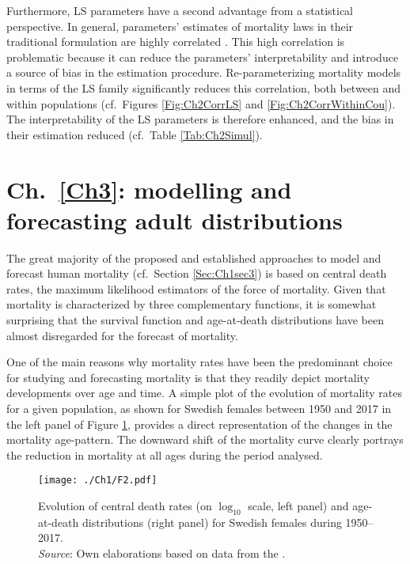 \documentclass[Thesis]{subfiles}
\begin{document}
Furthermore, LS parameters have a second advantage from a statistical perspective. In general, parameters' estimates of mortality laws in their traditional formulation are highly correlated \cite[cf.~Figure \ref{Fig:Ch2CorrNOR} in Chapter \ref{Ch2}, and see, for example,][]{missov2015gompertz}. This high correlation is problematic because it can reduce the parameters' interpretability and introduce a source of bias in the estimation procedure. Re-parameterizing mortality models in terms of the LS family significantly reduces this correlation, both between and within populations (cf.~Figures \ref{Fig:Ch2CorrLS} and \ref{Fig:Ch2CorrWithinCou}). The interpretability of the LS parameters is therefore enhanced, and the bias in their estimation reduced (cf.~Table \ref{Tab:Ch2Simul}).

\section{Ch.~\ref{Ch3}: modelling and forecasting adult distributions}\label{Sec:Ch1sec6}  
The great majority of the proposed and established approaches to model and forecast human mortality (cf.~Section \ref{Sec:Ch1sec3}) is based on central death rates, the maximum likelihood estimators of the force of mortality. Given that mortality is characterized by three complementary functions, it is somewhat surprising that the survival function and age-at-death distributions have been almost disregarded for the forecast of mortality.

One of the main reasons why mortality rates have been the predominant choice for studying and forecasting mortality is that they readily depict mortality developments over age and time. A simple plot of the evolution of mortality rates for a given population, as shown for Swedish females between 1950 and 2017 in the left panel of Figure \ref{Fig:Ch1MxDx}, provides a direct representation of the changes in the mortality age-pattern. The downward shift of the mortality curve clearly portrays the reduction in mortality at all ages during the period analysed.

\begin{figure}[!ht]
	\begin{center}
		\texttt{[image: ./Ch1/F2.pdf]}
		\caption{Evolution of central death rates (on $\log_{10}$ scale, left panel) and age-at-death distributions (right panel) for Swedish females during 1950--2017.\\
		\textit{Source}: Own elaborations based on data from the \cite{HMD}.}\label{Fig:Ch1MxDx}
	\end{center}
\end{figure} 
\end{document}
